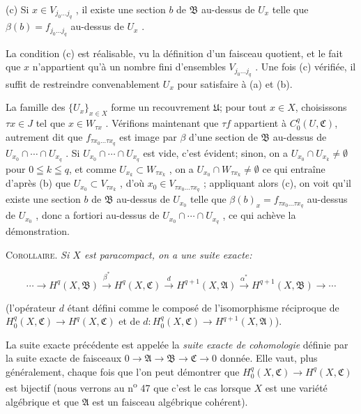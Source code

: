 (c) Si $x \in V_{j_0 \ldots j_q}$ , il existe une section $b$ de $\mathfrak{B}$ au-dessus de $U_x$ telle que $\beta(b) = f_{j_0 \ldots j_q}$ au-dessus de $U_x$ .

La condition (c) est réalisable, vu la définition d'un faisceau quotient, et le fait que $x$ n'appartient qu'à un nombre fini d'ensembles $V_{j_0 \ldots j_q}$ . Une fois (c) vérifiée, il suffit de restreindre convenablement $U_x$ pour satisfaire à (a) et (b).

La famille des $\{U_x\}_{x \in X}$ forme un recouvrement $\mathfrak{U}$; pour tout $x \in X$, choisissons $\tau x \in J$ tel que $x \in W_{\tau x}$ . Vérifions maintenant que $\tau f$ appartient à $C_0^q(U, \mathfrak{C})$, autrement dit que $f_{\tau x_0 \ldots \tau x_q}$ est image par $\beta$ d'une section de $\mathfrak{B}$ au-dessus de $U_{x_0} \cap \cdots \cap U_{x_q}$ . Si $U_{x_0} \cap \cdots \cap U_{x_q}$ est vide, c'est évident; sinon, on a $U_{x_0} \cap U_{x_k} \neq \emptyset$ pour $0 \leqq k \leqq q$, et comme $U_{x_k} \subset W_{\tau x_k}$ , on a $U_{x_0} \cap W_{\tau x_k} \neq \emptyset$ ce qui entraîne d'après (b) que $U_{x_0} \subset V_{\tau x_k}$ , d'où $x_0 \in V_{\tau x_0 \ldots \tau x_q}$ ; appliquant alors (c), on voit qu'il existe une section $b$ de $\mathfrak{B}$ au-dessus de $U_{x_0}$ telle que $\beta(b)_x = f_{\tau x_0 \ldots \tau x_q}$ au-dessus de $U_{x_0}$ , donc a fortiori au-dessus de $U_{x_0} \cap \cdots \cap U_{x_q}$ , ce qui achève la démonstration.

\textsc{Corollaire}. \textit{Si $X$ est paracompact, on a une suite exacte:}

\begin{equation*}
\cdots \longrightarrow H^q(X, \mathfrak{B}) \overset{\beta^*}{\longrightarrow} H^q(X, \mathfrak{C}) \overset{d}{\longrightarrow} H^{q+1}(X, \mathfrak{A}) \overset{\alpha^*}{\longrightarrow} H^{q+1}(X, \mathfrak{B}) \longrightarrow \cdots
\end{equation*}

(l'opérateur $d$ étant défini comme le composé de l'isomorphisme réciproque de $H_0^q(X, \mathfrak{C}) \rightarrow H^q(X, \mathfrak{C})$ et de $d: H_0^q(X, \mathfrak{C}) \rightarrow H^{q+1}(X, \mathfrak{A})$).

La suite exacte précédente est appelée la \textit{suite exacte de cohomologie} définie par la suite exacte de faisceaux $0 \rightarrow \mathfrak{A} \rightarrow \mathfrak{B} \rightarrow \mathfrak{C} \rightarrow 0$ donnée. Elle vaut, plus généralement, chaque fois que l'on peut démontrer que $H_0^q(X, \mathfrak{C}) \rightarrow H^q(X, \mathfrak{C})$ est bijectif (nous verrons au n\textsuperscript{o} 47 que c'est le cas lorsque $X$ est une variété algébrique et que $\mathfrak{A}$ est un faisceau algébrique cohérent).

